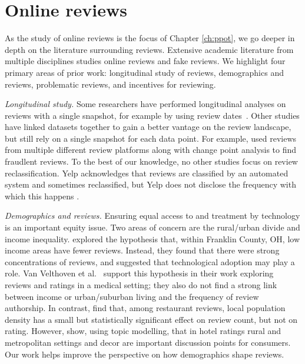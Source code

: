 \section{Online reviews} \label{sec:rim:related_work}


As the study of online reviews is the focus of Chapter \ref{ch:ppot}, we go deeper in depth on the literature surrounding reviews. Extensive academic literature from multiple disciplines studies online reviews and fake reviews. We highlight four primary areas of prior work: longitudinal study of reviews, demographics and reviews, problematic reviews, and incentives for reviewing.

\textit{Longitudinal study.} Some researchers have performed longitudinal analyses on reviews with a single snapshot, for example by using review dates~\cite{bakhshi2014demographics,ye2016temporal,wang2017temporal}.  Other studies have linked datasets together to gain a better vantage on the review landscape, but still rely on a single snapshot for each data point. For example, \citet{nilizadeh2019think} used reviews from multiple different review platforms along with change point analysis to find fraudlent reviews. To the best of our knowledge, no other studies focus on review reclassification. Yelp acknowledges that reviews are classified by an automated system and sometimes reclassified, but Yelp does not disclose the frequency with which this happens \cite{yelpwhyrec,yelpwhychange}.

\textit{Demographics and reviews.} Ensuring equal access to and treatment by technology is an important equity issue. Two areas of concern are the rural/urban divide and income inequality. \citet{baginski2014exploring} explored the hypothesis that, within Franklin County, OH, low income areas have fewer reviews. Instead, they found that there were strong concentrations of reviews, and suggested that technological adoption may play a role. Van Velthoven et al.~\cite{van2018cross} support this hypothesis in their work exploring reviews and ratings in a medical setting; they also do not find a strong link between income or urban/suburban living and the frequency of review authorship. In contrast, \citet{bakhshi2014demographics} find that, among restaurant reviews, local population density has a small but statistically significant effect on review count, but not on rating.  However, \citet{sutherland2020topic} show, using topic modelling, that in hotel ratings rural and metropolitan settings and decor are important discussion points for consumers. Our work helps improve the perspective on how demographics shape reviews.

